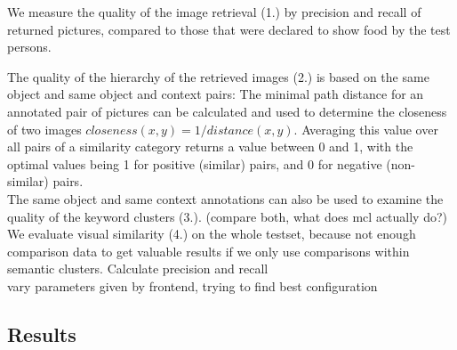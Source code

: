 We measure the quality of the image retrieval (1.) by precision and recall of returned pictures, compared to those that were declared to show food by the test persons.  

The quality of the hierarchy of the retrieved images (2.) is based on the same object and same object and context pairs: The  minimal path distance for an annotated pair of pictures can be calculated and used to determine the closeness of two images $closeness(x,y) = 1/distance(x,y)$. Averaging this value over all pairs of a similarity category returns a value between 0 and 1, with the optimal values being 1 for positive (similar) pairs, and 0 for negative (non-similar) pairs.\\
The same object and same context annotations can also be used to examine the quality of the keyword clusters (3.).  (compare both, what does mcl actually do?) \\

We evaluate visual similarity (4.) on the whole testset, because not enough comparison data to get valuable results if we only use comparisons within semantic clusters. Calculate precision and recall\\

vary parameters given by frontend, trying to find best configuration \\

\subsection{Results}

